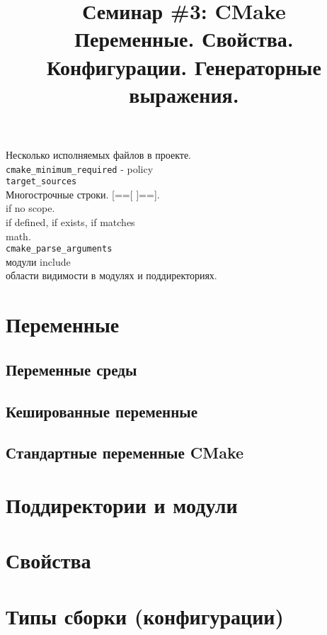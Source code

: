 \documentclass{article}
\begin{document}
\title{Семинар \#3: CMake \\[1ex] \large Переменные. Свойства. Конфигурации. Генераторные выражения. \vspace{-5ex}}
\date{}\maketitle

\noindent Несколько исполняемых файлов в проекте.\\
\texttt{cmake\_minimum\_required} - policy\\
\texttt{target\_sources}\\
Многострочные строки. [==[  ]==].\\
if no scope.\\
if defined, if exists, if matches\\
math.\\
\texttt{cmake\_parse\_arguments}\\
модули include\\
области видимости в модулях и поддиректориях.
\section{Переменные}

\subsection*{Переменные среды}

\subsection*{Кешированные переменные}

\subsection*{Стандартные переменные CMake}


\section{Поддиректории и модули}

\section{Свойства}

\section{Типы сборки (конфигурации)}
\end{document}
